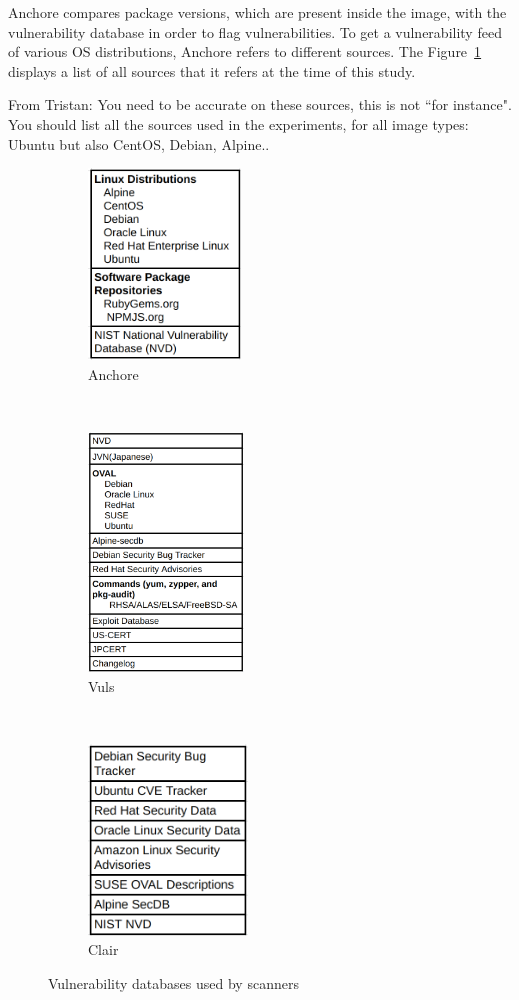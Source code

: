 \documentclass[a4paper,num-refs]{oup-contemporary}
\newcommand{\tristan}[1]{\color{blue}From Tristan: #1\color{black}}
\begin{document}
Anchore compares package versions, which are present inside the
image, with the vulnerability database in order to flag vulnerabilities.
To get a vulnerability feed of various OS distributions, Anchore refers to
different sources. The Figure~\ref{anchore} displays a list of all sources
that it refers at the time of this study.

\tristan{You need to be accurate on these sources, this is not ``for instance". 
You should list all the sources used in the experiments, for all image types: Ubuntu but also CentOS, Debian, Alpine.}.

\begin{figure}[!ht]
    \centering
	\begin{subfigure}[t]{0.3\textwidth}
        \includegraphics[height=2.0in]{Figures/anchore.png}
        \caption{Anchore}
        \label{anchore}
    \end{subfigure}%
    ~ 
	\begin{subfigure}[t]{0.3\textwidth}
        \includegraphics[height=2.5in]{Figures/vuls.png}
        \caption{Vuls}
        \label{vuls}
    \end{subfigure}
     ~
	\begin{subfigure}[t]{0.3\textwidth}
        \includegraphics[height=2.0in]{Figures/clair.png}
        \caption{Clair}
	\label{clair}
    \end{subfigure}
    \caption{Vulnerability databases used by scanners}
    \label{database}
\end{figure}
\end{document}

